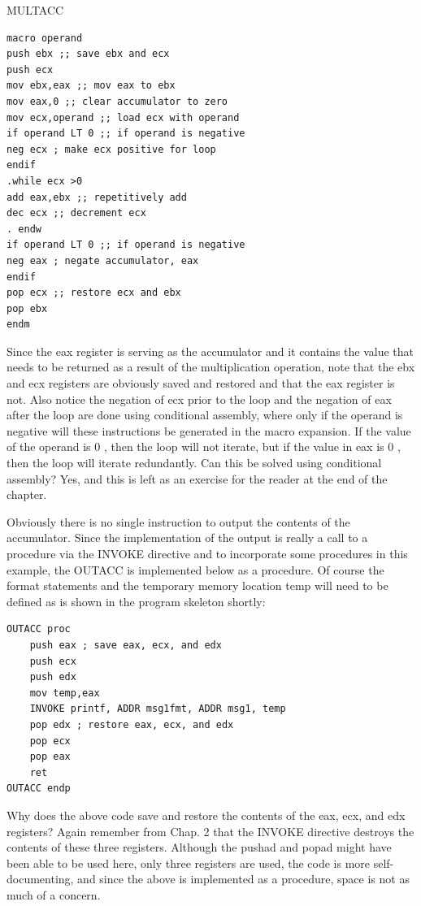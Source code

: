 \documentclass[10pt]{book}
\begin{document}
MULTACC

\begin{verbatim}
macro operand
push ebx ;; save ebx and ecx
push ecx
mov ebx,eax ;; mov eax to ebx
mov eax,0 ;; clear accumulator to zero
mov ecx,operand ;; load ecx with operand
if operand LT 0 ;; if operand is negative
neg ecx ; make ecx positive for loop
endif
.while ecx >0
add eax,ebx ;; repetitively add
dec ecx ;; decrement ecx
. endw
if operand LT 0 ;; if operand is negative
neg eax ; negate accumulator, eax
endif
pop ecx ;; restore ecx and ebx
pop ebx
endm
\end{verbatim}

Since the eax register is serving as the accumulator and it contains the value that needs to be returned as a result of the multiplication operation, note that the ebx and ecx registers are obviously saved and restored and that the eax register is not. Also notice the negation of ecx prior to the loop and the negation of eax after the loop are done using conditional assembly, where only if the operand is negative will these instructions be generated in the macro expansion. If the value of the operand is 0 , then the loop will not iterate, but if the value in eax is 0 , then the loop will iterate redundantly. Can this be solved using conditional assembly? Yes, and this is left as an exercise for the reader at the end of the chapter.

Obviously there is no single instruction to output the contents of the accumulator. Since the implementation of the output is really a call to a procedure via the INVOKE directive and to incorporate some procedures in this example, the OUTACC is implemented below as a procedure. Of course the format statements and the temporary memory location temp will need to be defined as is shown in the program skeleton shortly:

\begin{verbatim}
OUTACC proc
    push eax ; save eax, ecx, and edx
    push ecx
    push edx
    mov temp,eax
    INVOKE printf, ADDR msg1fmt, ADDR msg1, temp
    pop edx ; restore eax, ecx, and edx
    pop ecx
    pop eax
    ret
OUTACC endp
\end{verbatim}

Why does the above code save and restore the contents of the eax, ecx, and edx registers? Again remember from Chap. 2 that the INVOKE directive destroys the contents of these three registers. Although the pushad and popad might have been able to be used here, only three registers are used, the code is more self-documenting, and since the above is implemented as a procedure, space is not as much of a concern.
\end{document}
